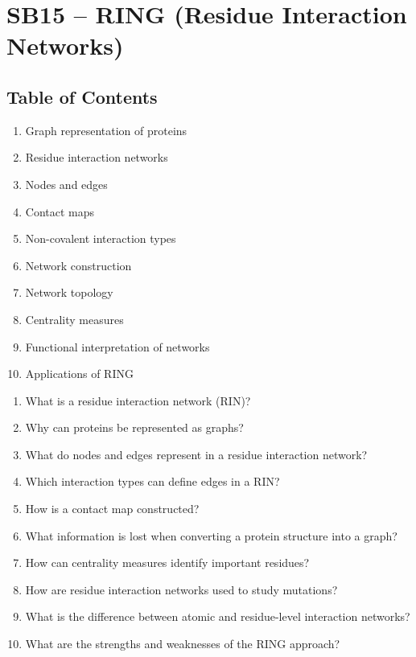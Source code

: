 \section{SB15 -- RING (Residue Interaction Networks)}

\subsection*{Table of Contents}

\begin{enumerate}
\item Graph representation of proteins
\item Residue interaction networks
\item Nodes and edges
\item Contact maps
\item Non-covalent interaction types
\item Network construction
\item Network topology
\item Centrality measures
\item Functional interpretation of networks
\item Applications of RING
\end{enumerate}


\begin{enumerate}
\item{What is a residue interaction network (RIN)?}
\item{Why can proteins be represented as graphs?}
\item{What do nodes and edges represent in a residue interaction network?}
\item{Which interaction types can define edges in a RIN?}
\item{How is a contact map constructed?}
\item{What information is lost when converting a protein structure into a graph?}
\item{How can centrality measures identify important residues?}
\item{How are residue interaction networks used to study mutations?}
\item{What is the difference between atomic and residue-level interaction networks?}
\item{What are the strengths and weaknesses of the RING approach?}
\end{enumerate}